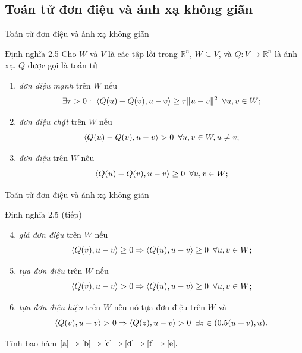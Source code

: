 \documentclass[aspectratio=169]{beamer}
\DeclarePairedDelimiter{\pro}{\langle}{\rangle}
\DeclarePairedDelimiter{\norm}{\lVert}{\rVert}
\theoremstyle{plain}
\theoremstyle{definition}
\theoremstyle{remark}
\begin{document}
\subsection{Toán tử đơn điệu và ánh xạ không giãn}
\begin{frame}{Toán tử đơn điệu và ánh xạ không giãn}\pause
\begin{block}{Định nghĩa 2.5}
Cho $W$ và $V$ là các tập lồi trong $\mathbb{R}^n$, $W\subseteq V$, và $Q: V\to\mathbb{R}^n$ là ánh xạ. $Q$ được gọi là toán tử
	\begin{enumerate}
		\item \textit{đơn điệu mạnh} trên $W$ nếu
		$$
		\exists\tau>0:\ \pro{Q(u)-Q(v),u-v}\geq\tau\norm{u-v}^2\enskip\forall u,v\in W;\label{a}
		$$ 
		\item \textit{đơn điệu chặt} trên $W$ nếu
		$$
		\pro{Q(u)-Q(v),u-v}>0\enskip\forall u,v\in W, u\neq v;\label{b}
		$$ 
		\item \textit{đơn điệu} trên $W$ nếu
		$$
		\pro{Q(u)-Q(v),u-v}\geq0\enskip\forall u,v\in W; \label{c}
		$$ 
	\end{enumerate}
\end{block}
\end{frame}
\begin{frame}{Toán tử đơn điệu và ánh xạ không giãn}
\begin{block}{Định nghĩa 2.5 (tiếp)}
    \begin{enumerate}
    \setcounter{enumi}{3}
		\item \textit{giả đơn điệu} trên $W$ nếu
		$$
		\pro{Q(v),u-v}\geq 0\Rightarrow \pro{Q(u),u-v}\geq 0\enskip\forall u,v\in W; \label{d}
		$$ 
		\item \textit{tựa đơn điệu} trên $W$ nếu
		$$
		\pro{Q(v),u-v}>0\Rightarrow\pro{Q(u),u-v}\geq0\enskip\forall u,v\in W; \label{e}
		$$ 
		\item \textit{tựa đơn điệu hiện} trên $W$ nếu nó tựa đơn điệu trên $W$ và 
		$$
		\pro{Q(v),u-v}>0\Rightarrow\pro{Q(z),u-v}>0 \enskip\exists z\in(0.5(u+v),u). \label{f}
		$$ 
	\end{enumerate}
\end{block}
Tính bao hàm $\ref{a}\Rightarrow\ref{b}\Rightarrow\ref{c}\Rightarrow\ref{d}\Rightarrow\ref{f}\Rightarrow\ref{e}.$
\end{frame}
\end{document}

